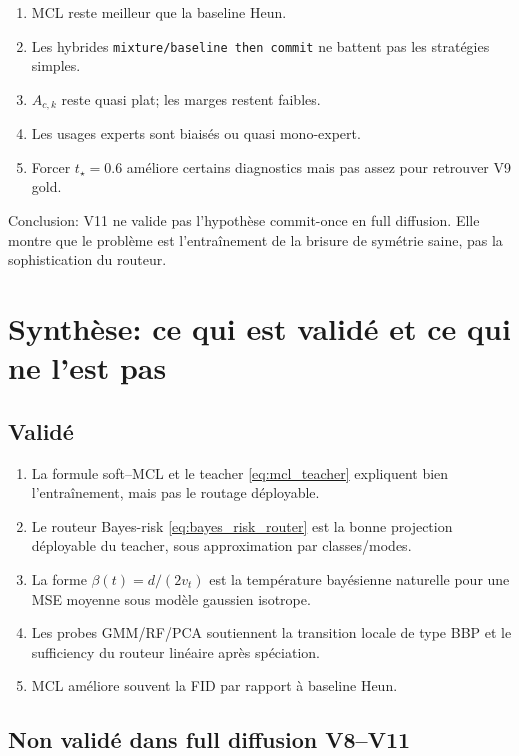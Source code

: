 \documentclass[11pt,a4paper]{article}
\newcommand{\1}{\mathbf{1}}
\begin{document}
\begin{enumerate}[leftmargin=2em]
\item MCL reste meilleur que la baseline Heun.
\item Les hybrides \texttt{mixture/baseline then commit} ne battent pas les stratégies simples.
\item $A_{c,k}$ reste quasi plat; les marges restent faibles.
\item Les usages experts sont biaisés ou quasi mono-expert.
\item Forcer $t_\star=0.6$ améliore certains diagnostics mais pas assez pour retrouver V9 gold.
\end{enumerate}

Conclusion: V11 ne valide pas l'hypothèse commit-once en full diffusion. Elle montre que le problème est l'entraînement de la brisure de symétrie saine, pas la sophistication du routeur.

\section{Synthèse: ce qui est validé et ce qui ne l'est pas}

\subsection{Validé}

\begin{enumerate}[leftmargin=2em]
\item La formule soft--MCL et le teacher \eqref{eq:mcl_teacher} expliquent bien l'entraînement, mais pas le routage déployable.
\item Le routeur Bayes-risk \eqref{eq:bayes_risk_router} est la bonne projection déployable du teacher, sous approximation par classes/modes.
\item La forme $\beta(t)=d/(2v_t)$ est la température bayésienne naturelle pour une MSE moyenne sous modèle gaussien isotrope.
\item Les probes GMM/RF/PCA soutiennent la transition locale de type BBP et le sufficiency du routeur linéaire après spéciation.
\item MCL améliore souvent la FID par rapport à baseline Heun.
\end{enumerate}

\subsection{Non validé dans full diffusion V8--V11}
\end{document}
